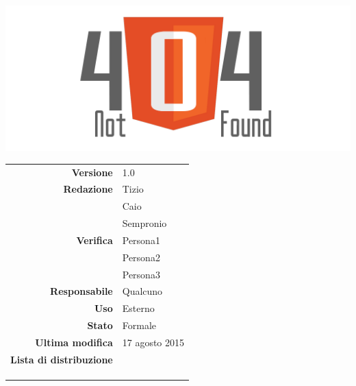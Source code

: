 \thispagestyle{empty}

\begin{titlepage}

	\begin{center}
	\begin{Huge}
		\textbf{\gruppo} \\
	\end{Huge}
	\vspace{0.5cm}
	\begin{Large}
		\textbf{\capitolato}
	\end{Large}
	
	\vspace{1cm}

	\includegraphics[scale=0.35]{../logo/logo404_Extends.png}
	\vspace{1cm}
	\begin{Huge}
		\textbf{\titDoc}
	\end{Huge}
	
	\vspace{1cm}
	
	\begin{table}[h]
	\begin{center}
	\begin{tabular}{r | l}
		\textbf{Versione} & 1.0 \\
		\textbf{Redazione} & Tizio \\ 
			& Caio \\ 
			& Sempronio \\
		\textbf{Verifica} & Persona1 \\ 
			& Persona2 \\ 
			& Persona3 \\
		\textbf{Responsabile} & Qualcuno \\
		\textbf{Uso} & Esterno \\
		\textbf{Stato} & Formale \\
		\textbf{Ultima modifica} & 17 agosto 2015 \\
		\textbf{Lista di distribuzione} & \gruppo \\ 
			& \Vardanega \\
			& \Cardin \\
			& \Zucchetti \\
	\end{tabular}
	\end{center}
	\end{table}
	\end{center}
\end{titlepage}